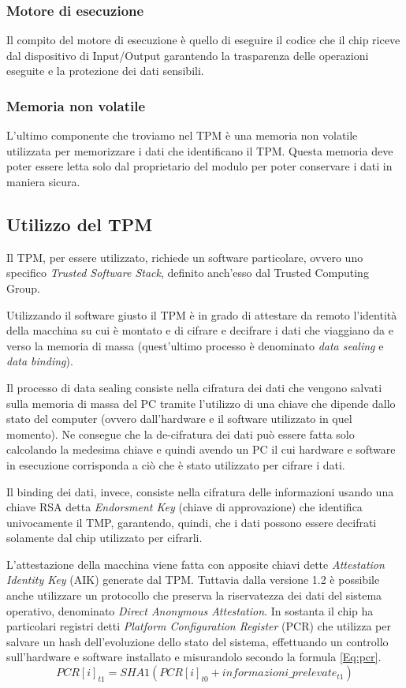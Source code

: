 \subsubsection{Motore di esecuzione}
Il compito del motore di esecuzione è quello di eseguire il codice che il chip riceve dal dispositivo di Input/Output garantendo la trasparenza delle operazioni eseguite e la protezione dei dati sensibili.

\subsubsection{Memoria non volatile}
L'ultimo componente che troviamo nel TPM è una memoria non volatile utilizzata per memorizzare i dati che identificano il TPM. Questa memoria deve poter essere letta solo dal proprietario del modulo per poter conservare i dati in maniera sicura.

\subsection{Utilizzo del TPM}
Il TPM, per essere utilizzato, richiede un software particolare, ovvero uno specifico \textit{Trusted Software Stack}, definito anch'esso dal Trusted Computing Group.

Utilizzando il software giusto il TPM è in grado di attestare da remoto l'identità della macchina su cui è montato e di cifrare e decifrare i dati che viaggiano da e verso la memoria di massa (quest'ultimo processo è denominato \textit{data sealing} e \textit{data binding}).

Il processo di data sealing consiste nella cifratura dei dati che vengono salvati sulla memoria di massa del PC tramite l'utilizzo di una chiave che dipende dallo stato del computer (ovvero dall'hardware e il software utilizzato in quel momento). Ne consegue che la de-cifratura dei dati può essere fatta solo calcolando la medesima chiave e quindi avendo un PC il cui hardware e software in esecuzione corrisponda a ciò che è stato utilizzato per cifrare i dati.

Il binding dei dati, invece, consiste nella cifratura delle informazioni usando una chiave RSA detta \textit{Endorsment Key} (chiave di approvazione) che identifica univocamente il TMP, garantendo, quindi, che i dati possono essere decifrati solamente dal chip utilizzato per cifrarli.

L'attestazione della macchina viene fatta con apposite chiavi dette \textit{Attestation Identity Key} (AIK) generate dal TPM. Tuttavia dalla versione 1.2 è possibile anche utilizzare un protocollo che preserva la riservatezza dei dati del sistema operativo, denominato \textit{Direct Anonymous Attestation}. In sostanta il chip ha particolari registri detti \textit{Platform Configuration Register} (PCR) che utilizza per salvare un hash dell'evoluzione dello stato del sistema, effettuando un controllo sull'hardware e software installato e misurandolo secondo la formula \ref{Eq:pcr}.
    \begin{equation}
   	PCR[i]_{t1} = SHA1(PCR[i]_{t0} + informazioni\_prelevate_{t1})
    	\label{Eq:pcr}
    \end{equation}
    
